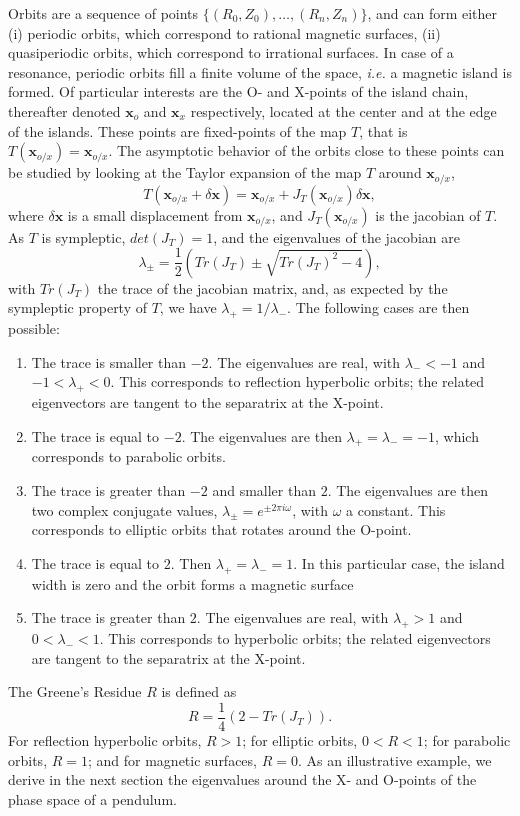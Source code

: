 \documentclass[my_thesis.tex]{subfiles}
\begin{document}
Orbits are a sequence of points $\{(R_0,Z_0),\ldots,(R_n,Z_n)\}$, and can form either (i) periodic orbits, which correspond to rational magnetic surfaces, (ii) quasiperiodic orbits, which correspond to irrational surfaces. In case of a resonance, periodic orbits fill a finite volume of the space, \textit{i.e.} a magnetic island is formed. Of particular interests are the O- and X-points of the island chain, thereafter denoted $\mathbf{x}_o$ and $\mathbf{x}_x$ respectively, located at the center and at the edge of the islands. These points are fixed-points of the map $T$, that is $T(\mathbf{x}_{o/x})=\mathbf{x}_{o/x}$. The asymptotic behavior of the orbits close to these points can be studied by looking at the Taylor expansion of the map $T$ around $\mathbf{x}_{o/x}$, 
\begin{equation}
	T(\mathbf{x}_{o/x}+\delta\mathbf{x}) = \mathbf{x}_{o/x} + J_T(\mathbf{x}_{o/x})\delta\mathbf{x},
\end{equation}
where $\delta\mathbf{x}$ is a small displacement from $\mathbf{x}_{o/x}$, and $J_T(\mathbf{x}_{o/x})$ is the jacobian of $T$. As $T$ is sympleptic, $det(J_T)=1$, and the eigenvalues of the jacobian are 
\begin{equation}
	\lambda_{\pm} = \frac{1}{2}\left(Tr(J_T)\pm\sqrt{Tr(J_T)^2 - 4}\right),
\end{equation}
with $Tr(J_T)$ the trace of the jacobian matrix, and, as expected by the sympleptic property of $T$, we have $\lambda_+ = 1/\lambda_-$. The following cases are then possible:
\begin{enumerate}
	\item The trace is smaller than $-2$. The eigenvalues are real, with $\lambda_-<-1$ and $-1<\lambda_+<0$. This corresponds to reflection hyperbolic orbits; the related eigenvectors are tangent to the separatrix at the X-point.
	\item The trace is equal to $-2$. The eigenvalues are then $\lambda_+=\lambda_-=-1$, which corresponds to parabolic orbits.
	\item The trace is greater than $-2$ and smaller than $2$. The eigenvalues are then two complex conjugate values, $\lambda_\pm=e^{\pm 2\pi i \omega}$, with $\omega$ a constant. This corresponds to elliptic orbits that rotates around the O-point.
	\item The trace is equal to $2$. Then $\lambda_+=\lambda_-=1$. In this particular case, the island width is zero and the orbit forms a magnetic surface
	\item The trace is greater than $2$. The eigenvalues are real, with $\lambda_+>1$ and $0<\lambda_-<1$. This corresponds to hyperbolic orbits; the related eigenvectors are tangent to the separatrix at the X-point.
\end{enumerate} 
The Greene's Residue $R$ is defined as
\begin{equation}
	R = \frac{1}{4}\left(2-Tr(J_T)\right).
\end{equation}
For reflection hyperbolic orbits, $R>1$; for elliptic orbits, $0<R<1$; for parabolic orbits, $R=1$; and for magnetic surfaces, $R=0$. As an illustrative example, we derive in the next section the eigenvalues around the X- and O-points of the phase space of a pendulum.
\end{document}
